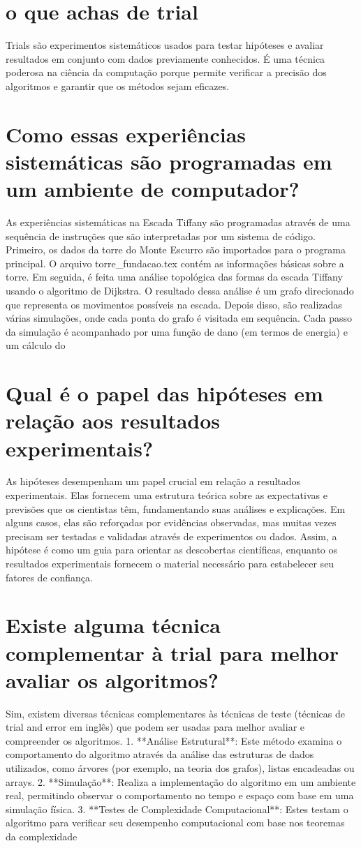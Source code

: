 \documentclass[11pt,a4paper]{article}
\begin{document}
\section{o que achas de trial}
Trials são experimentos sistemáticos usados para testar hipóteses e avaliar resultados em conjunto com dados previamente conhecidos. É uma técnica poderosa na ciência da computação porque permite verificar a precisão dos algoritmos e garantir que os métodos sejam eficazes.

\section{Como essas experiências sistemáticas são programadas em um ambiente de computador?}
As experiências sistemáticas na Escada Tiffany são programadas através de uma sequência de instruções que são interpretadas por um sistema de código. Primeiro, os dados da torre do Monte Escurro são importados para o programa principal. O arquivo torre\_fundacao.tex contém as informações básicas sobre a torre. Em seguida, é feita uma análise topológica das formas da escada Tiffany usando o algoritmo de Dijkstra. O resultado dessa análise é um grafo direcionado que representa os movimentos possíveis na escada. Depois disso, são realizadas várias simulações, onde cada ponta do grafo é visitada em sequência. Cada passo da simulação é acompanhado por uma função de dano (em termos de energia) e um cálculo do

\section{Qual é o papel das hipóteses em relação aos resultados experimentais?}
As hipóteses desempenham um papel crucial em relação a resultados experimentais. Elas fornecem uma estrutura teórica sobre as expectativas e previsões que os cientistas têm, fundamentando suas análises e explicações. Em alguns casos, elas são reforçadas por evidências observadas, mas muitas vezes precisam ser testadas e validadas através de experimentos ou dados. Assim, a hipótese é como um guia para orientar as descobertas científicas, enquanto os resultados experimentais fornecem o material necessário para estabelecer seu fatores de confiança.

\section{Existe alguma técnica complementar à trial para melhor avaliar os algoritmos?}
Sim, existem diversas técnicas complementares às técnicas de teste (técnicas de trial and error em inglês) que podem ser usadas para melhor avaliar e compreender os algoritmos. 1. **Análise Estrutural**: Este método examina o comportamento do algoritmo através da análise das estruturas de dados utilizados, como árvores (por exemplo, na teoria dos grafos), listas encadeadas ou arrays. 2. **Simulação**: Realiza a implementação do algoritmo em um ambiente real, permitindo observar o comportamento no tempo e espaço com base em uma simulação física. 3. **Testes de Complexidade Computacional**: Estes testam o algoritmo para verificar seu desempenho computacional com base nos teoremas da complexidade
\end{document}
